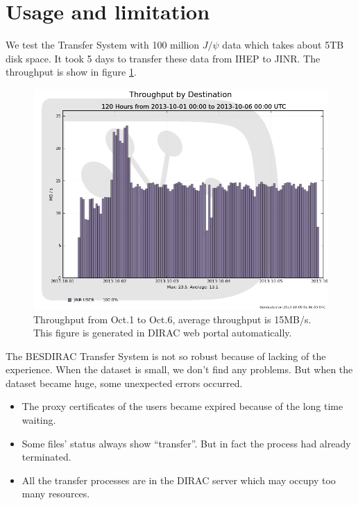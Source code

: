 \section{Usage and limitation}
We test the Transfer System with 100 million $J/\psi$ data 
which takes about 5TB disk space. It took 5 days to transfer 
these data from IHEP to JINR. The throughput is show in 
figure \ref{fig:throughput}.

\begin{figure}[h]
\includegraphics[width=.6\textwidth, keepaspectratio]{data/throughput-dest-1001-10-06.png}
\begin{minipage}[b]{.4\textwidth}
    \caption{\label{fig:throughput}Throughput from Oct.1 to Oct.6, 
    average throughput is 15MB/s. This figure is generated in 
    DIRAC web portal automatically.}
\end{minipage}
\end{figure}

The BESDIRAC Transfer System is not so robust
because of lacking of the experience.
When the dataset is small, we don't find any problems.
But when the dataset became huge, some unexpected errors occurred.
\begin{itemize}
    \item The proxy certificates of the users became expired
            because of the long time waiting.
    \item Some files' status always show ``transfer''.
            But in fact the process had already terminated.
    \item All the transfer processes are in the DIRAC server
            which may occupy too many resources.
\end{itemize}
